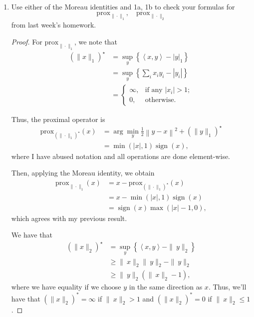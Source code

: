 \documentclass[11pt]{amsart}
\begin{document}
\begin{enumerate}
\begin{enumerate}
\begin{proof}
\end{proof}


\item Use either of the Moreau identities and 1a, 1b to check your formulas for
\[
\mbox{prox}_{\|\cdot\|_1}, \quad \mbox{prox}_{\|\cdot\|_2}
\]
from last week's homework.

\begin{proof}
  For $\mbox{prox}_{\|\cdot\|_1}$, we note that
  \begin{align*}
    \left(\|x\|_1\right)^\star
    &= \sup_y \left\{\left\langle x, y \right\rangle - |y|_1\right\} \\
    &= \sup_y \left\{\sum_i x_iy_i - |y_i|\right\} \\
    &= \begin{cases}
      \infty, &\text{if any $\left|x_i\right| > 1$}; \\
      0, &\text{otherwise.}
    \end{cases}
  \end{align*}

  Thus, the proximal operator is
  \begin{align*}
    \mbox{prox}_{\left(\|\cdot\|_1\right)^\star}\left(x\right)
    &= \arg\min_y\frac{1}{2}\left\|y - x\right\|^2 + \left(\|y\|_1\right)^\star \\
    &= \min(\left|x\right|, 1)\operatorname{sign}\left(x\right),
  \end{align*}
  where I have abused notation and all operations are done element-wise.
  

  Then, applying the Moreau identity, we obtain
  \begin{align*}
    \mbox{prox}_{\|\cdot\|_1} (x)
    &= x - \mbox{prox}_{\left(\|\cdot\|_1\right)^\star} (x) \\
    &= x - \min(\left|x\right|, 1)\operatorname{sign}\left(x\right) \\
    &= \operatorname{sign}\left(x\right)\max\left(\left|x\right| - 1, 0\right),
  \end{align*}
  which agrees with my previous result.
  
  We have that
  \begin{align*}
    \left(\|x\|_2\right)^\star
    &= \sup_y \left\{\left\langle x, y\right\rangle - \|\ y \|_2\right\} \\
    &\geq \|\ x \|_2 \|\ y \|_2 - \|\ y \|_2 \\
    &\geq \|\ y \|_2\left(\|\ x \|_2  - 1\right),
  \end{align*}
  where we have equality if we choose $y$ in the same direction as $x$. Thus,
  we'll have that $\left(\|x\|_2\right)^* = \infty$ if $\|\ x \|_2 > 1$ and
  $\left(\|x\|_2\right)^* = 0$ if $\|\ x \|_2 \leq 1$.


\end{proof}
\end{enumerate}
\end{enumerate}
\end{document}
